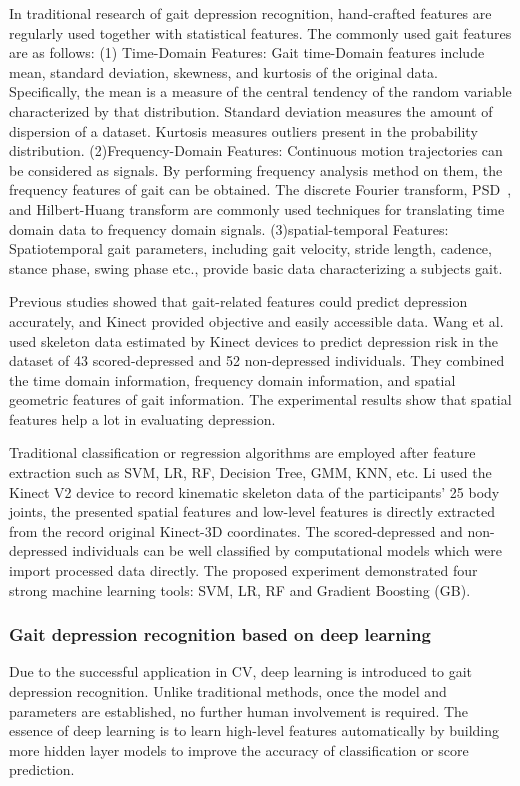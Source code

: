 In traditional research of gait depression recognition, hand-crafted features are regularly used together with statistical features. The commonly used gait features are as follows:
(1) Time-Domain Features: Gait time-Domain features include mean, standard deviation, skewness, and kurtosis of the original data.
Specifically, the mean is a measure of the central tendency of the random variable characterized by
that distribution.
Standard deviation measures the amount of dispersion of a dataset.
Kurtosis measures outliers present in the probability distribution.
(2)Frequency-Domain Features:
Continuous motion trajectories can be considered as signals.
By performing frequency analysis method on them, the frequency features of gait can be obtained.
The discrete Fourier transform, PSD~\cite{tuzel2007human}, and  Hilbert-Huang
transform are commonly used techniques for translating time domain data to frequency domain signals.
(3)spatial-temporal Features: Spatiotemporal gait parameters, including gait velocity, stride length, cadence, stance phase, swing phase etc., provide basic data characterizing a subjects gait.

Previous studies showed that gait-related features could predict depression accurately, and Kinect provided objective and easily accessible data.
Wang et al.\cite{wang2021detecting} used skeleton data estimated by Kinect devices to
predict depression risk in the dataset of 43 scored-depressed and 52 non-depressed individuals. They combined the time domain information, frequency domain information, and spatial geometric features of gait information. The experimental results show that spatial features help a lot in evaluating depression.


Traditional classification or regression algorithms are employed after feature extraction such as SVM, LR, RF, Decision Tree, GMM, KNN, etc.
Li \cite{li2021simple} used the Kinect V2 device to record kinematic skeleton data of the participants' 25 body joints, the presented spatial features and low-level features is directly extracted from the record original Kinect-3D coordinates.
The scored-depressed and non-depressed individuals can be well classified by computational models which were import processed data directly. The proposed experiment demonstrated four strong machine learning tools: SVM, LR, RF and Gradient Boosting (GB).



\subsubsection{Gait depression recognition based
on deep learning}
Due to the successful application in CV, deep learning is introduced to gait depression recognition.
Unlike traditional methods, once the model and parameters are established, no further human involvement is required.
The essence of deep learning is to learn high-level features automatically by building more hidden layer models to improve the accuracy of classification or score prediction.

